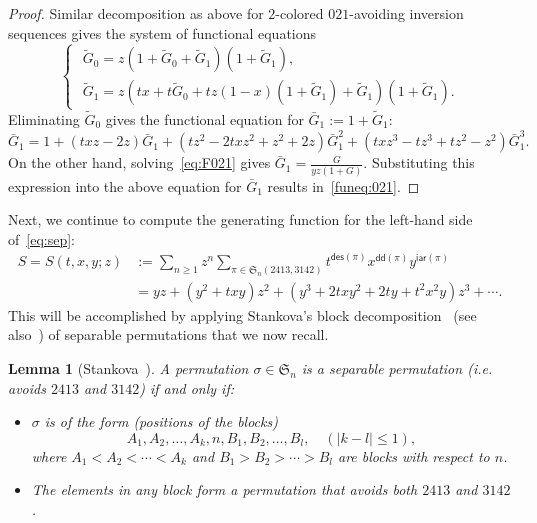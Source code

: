 \documentclass[12pt]{amsart}
\numberwithin{equation}{section}
\theoremstyle{plain}
\newtheorem{lemma}[theorem]{Lemma}
\theoremstyle{definition}
\def\des{\mathsf{des}}
\def\S{\mathfrak{S}}
\def\iar{\mathsf{iar}}
\def\dd{\mathsf{dd}}
\begin{document}
\begin{proof}
Similar decomposition as above for $2$-colored $021$-avoiding inversion sequences  gives the system of functional equations
 $$
\begin{cases}
\,\,\tilde  G_0=z(1+\tilde G_0+\tilde G_1)(1+\tilde G_1),
\\
\,\,\tilde G_1=z(tx+t\tilde G_0+tz(1-x)(1+\tilde G_1)+\tilde G_1)(1+\tilde G_1).
\end{cases}
$$
Eliminating $\tilde G_0$ gives the functional equation for $\bar G_1:=1+\tilde G_1$:
\begin{equation*}
 \bar G_1=1+(txz-2z)\bar G_1+(tz^2-2txz^2+z^2+2z)\bar G_1^2+(txz^3-tz^3+tz^2-z^2)\bar G_1^3.
\end{equation*}
On the other hand, solving~\eqref{eq:F021} gives 
$\bar G_1=\frac{G}{yz(1+G)}$. Substituting this expression into the above equation for $\bar G_1$ results in~\eqref{funeq:021}. 
\end{proof}

Next, we continue to compute the generating function for the left-hand side of~\eqref{eq:sep}:
\begin{align*}
S=S(t,x,y;z)&:=\sum_{n\geq1}z^n\sum_{\pi\in\S_n(2413,3142)}t^{\des(\pi)}x^{\dd(\pi)}y^{\iar(\pi)}\\
&=yz+(y^2+txy)z^2+(y^3+2txy^2+2ty+t^2x^2y)z^3+\cdots.
\end{align*}
This will be accomplished by applying Stankova's block decomposition~\cite{sk} (see also~\cite{lin}) of separable permutations that we now recall. 

\begin{lemma}[Stankova~\cite{sk}]\label{dec:stankova}
A permutation $\sigma\in\S_n$ is a separable permutation (i.e. avoids $2413$ and $3142$) if and only if:
\begin{itemize}
\item[(i)] $\sigma$ is of the form (positions of the blocks)
$$
A_1, A_2, \ldots, A_k,n, B_1, B_2,\ldots, B_l,\quad (|k-l|\leq1),
$$
where $A_1<A_2<\cdots<A_k$ and $B_1>B_2>\cdots >B_l$ are blocks with respect to $n$.
\item[(ii)] The elements in any block form a permutation that avoids both $2413$ and $3142$.
\end{itemize}
\end{lemma}
\end{document}
